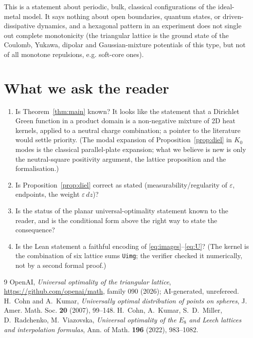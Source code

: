 \documentclass[11pt,a4paper]{article}
\theoremstyle{remark}
\begin{document}
This is a statement about periodic, bulk, classical configurations of the ideal-metal model. It says nothing about open boundaries,
quantum states, or driven-dissipative dynamics, and a hexagonal pattern in an experiment does not single out complete monotonicity
(the triangular lattice is the ground state of the Coulomb, Yukawa, dipolar and Gaussian-mixture potentials of this type, but not of all monotone repulsions, e.g. soft-core ones).

\section{What we ask the reader}

\begin{enumerate}[itemsep=2pt]
\item Is Theorem~\ref{thm:main} known? It looks like the statement that a Dirichlet Green function in a product domain is a
non-negative mixture of 2D heat kernels, applied to a neutral charge combination; a pointer to the literature would settle priority. (The modal expansion of Proposition~\ref{prop:diel} in $K_0$ modes is the classical parallel-plate expansion; what we believe is new is only the neutral-square positivity argument, the lattice proposition and the formalisation.)
\item Is Proposition~\ref{prop:diel} correct as stated (measurability/regularity of $\varepsilon$, endpoints, the weight $\varepsilon\,dz$)?
\item Is the status of the planar universal-optimality statement known to the reader, and is the conditional form above the right way to
state the consequence?
\item Is the Lean statement a faithful encoding of \eqref{eq:images}--\eqref{eq:U}? (The kernel is the combination of six lattice sums
\texttt{Uimg}; the verifier checked it numerically, not by a second formal proof.)
\end{enumerate}

\begin{thebibliography}{9}\small
{} OpenAI, \emph{Universal optimality of the triangular lattice}, \url{https://github.com/openai/math}, family 090 (2026); AI-generated, unrefereed.
 H.~Cohn and A.~Kumar, \emph{Universally optimal distribution of points on spheres}, J. Amer. Math. Soc. \textbf{20} (2007), 99--148.
 H.~Cohn, A.~Kumar, S.~D.~Miller, D.~Radchenko, M.~Viazovska, \emph{Universal optimality of the $E_8$ and Leech lattices and interpolation formulas}, Ann. of Math. \textbf{196} (2022), 983--1082.
\end{thebibliography}
\end{document}
